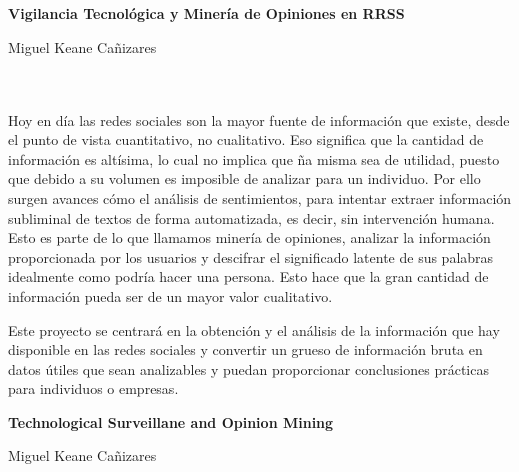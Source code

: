 \chapter*{}


%



\cleardoublepage
\thispagestyle{empty}

\begin{center}
{\large\bfseries Vigilancia Tecnológica y Minería de Opiniones en RRSS}\\
\end{center}
\begin{center}
Miguel Keane Cañizares \\
\end{center}

\\

\vspace{0.7cm}
\\

Hoy en día las redes sociales son la mayor fuente de información que existe, desde el punto de vista cuantitativo, no cualitativo. Eso significa que la cantidad de información es altísima, lo cual no implica que ña misma sea de utilidad, puesto que debido a su volumen es imposible de analizar para un individuo. Por ello surgen avances cómo el análisis de sentimientos, para intentar extraer información subliminal de textos de forma automatizada, es decir, sin intervención humana. Esto es parte de lo que llamamos minería de opiniones, analizar la información proporcionada por los usuarios y descifrar el significado latente de sus palabras idealmente como podría hacer una persona. Esto hace que la gran cantidad de información pueda ser de un mayor valor cualitativo. 

Este proyecto se centrará en la obtención y el análisis de la información que hay disponible en las redes sociales y convertir un grueso de información bruta en datos útiles que sean analizables y puedan proporcionar conclusiones prácticas para individuos o empresas. 
\cleardoublepage


\thispagestyle{empty}


\begin{center}
{\large\bfseries Technological Surveillane and Opinion Mining}\\
\end{center}
\begin{center}
Miguel Keane Cañizares\\
\end{center}

